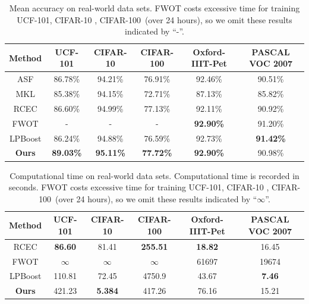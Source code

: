 \documentclass[letterpaper]{article} %
\begin{document}
\begin{table}[t]
\centering
\begin{tabular}{|c|c|c|c|c|c|}
\hline
Method         & UCF-101          & CIFAR-10         & CIFAR-100        & Oxford-IIIT-Pet  & PASCAL VOC 2007    \\\hline
ASF            & 86.78\%          & 94.21\%          & 76.91\%          & 92.46\%          &   90.51\%          \\
MKL            & 85.38\%          & 94.15\%          & 72.71\%          & 87.13\%          &   85.82\%          \\
RCEC           & 86.60\%          & 94.99\%          & 77.13\%          & 92.11\%          &   90.92\%          \\
FWOT           & -                & -                & -                & \textbf{92.90\%} &   91.20\%          \\
LPBoost        & 86.24\%          & 94.88\%          & 76.59\%          & 92.73\%          &   \textbf{91.42\%} \\\hline
\textbf{Ours}  & \textbf{89.03\%} & \textbf{95.11\%} & \textbf{77.72\%} & \textbf{92.90\%} &   90.98\%          \\
\hline
\end{tabular}
\caption{Mean accuracy on real-world data sets.
FWOT costs excessive time for training UCF-101, CIFAR-10 , CIFAR-100~(over 24 hours),
so we omit these results indicated by ``-''.
}
\label{table:total_acc}
\end{table}


\begin{table}[t]
\centering
\begin{tabular}{|c|c|c|c|c|c|}
\hline
Method        & UCF-101         & CIFAR-10        & CIFAR-100        & Oxford-IIIT-Pet & PASCAL VOC 2007 \\\hline
RCEC          & \textbf{86.60}  & 81.41           &  \textbf{255.51} & \textbf{18.82}  &   16.45         \\
FWOT          & $\infty$        & $\infty$        &  $\infty$        & 61697           &   19674         \\
LPBoost       & 110.81          & 72.45           &  4750.9          & 43.67           &   \textbf{7.46} \\\hline
\bf{Ours}     & 421.23          & \textbf{5.384}  &  417.26          & 76.16           &   15.21         \\
\hline
\end{tabular}
\caption{Computational time on real-world data sets. Computational time is recorded in seconds.
FWOT costs excessive time for training UCF-101, CIFAR-10 , CIFAR-100~(over 24 hours),
so we omit these results indicated by ``$\infty$''.}
\label{table:total_time}
\end{table}
\end{document}
